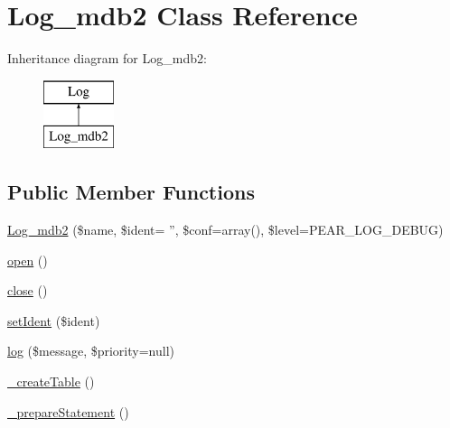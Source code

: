 \hypertarget{class_log__mdb2}{
\section{Log\_\-mdb2 Class Reference}
\label{class_log__mdb2}
}
Inheritance diagram for Log\_\-mdb2:\begin{figure}[H]
\begin{center}
\leavevmode
\includegraphics[height=2.000000cm]{class_log__mdb2}
\end{center}
\end{figure}
\subsection*{Public Member Functions}
\begin{DoxyCompactItemize}
\item 
\hyperlink{class_log__mdb2_abd0b9186c1e7b908c02e76652623cb00}{Log\_\-mdb2} (\$name, \$ident= '', \$conf=array(), \$level=PEAR\_\-LOG\_\-DEBUG)
\item 
\hyperlink{class_log__mdb2_a44a2ac59a3b91f8c18905dce700934d6}{open} ()
\item 
\hyperlink{class_log__mdb2_aa69c8bf1f1dcf4e72552efff1fe3e87e}{close} ()
\item 
\hyperlink{class_log__mdb2_a9d8352d257344340d7a5b9c081d2a0d9}{setIdent} (\$ident)
\item 
\hyperlink{class_log__mdb2_ac3758dfa38a67df158a446847cf06413}{log} (\$message, \$priority=null)
\item 
\hyperlink{class_log__mdb2_afd74c103c3222e079962fd416e071857}{\_\-createTable} ()
\item 
\hyperlink{class_log__mdb2_afdc936abae49f02ed9157385c9dd10c4}{\_\-prepareStatement} ()
\end{DoxyCompactItemize}
